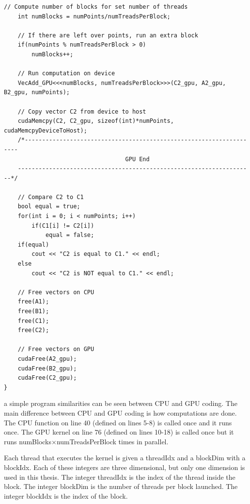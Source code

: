 \begin{lstlisting}[caption={Comparison of CPU verse GPU code.},label={code:GPUvsCPU}]
	// Compute number of blocks for set number of threads
	int numBlocks = numPoints/numTreadsPerBlock;

	// If there are left over points, run an extra block
	if(numPoints % numTreadsPerBlock > 0)
		numBlocks++;

	// Run computation on device
	VecAdd_GPU<<<numBlocks, numTreadsPerBlock>>>(C2_gpu, A2_gpu, B2_gpu, numPoints);

	// Copy vector C2 from device to host
	cudaMemcpy(C2, C2_gpu, sizeof(int)*numPoints, cudaMemcpyDeviceToHost);
	/*--------------------------------------------------------------------
                               	   GPU End
	--------------------------------------------------------------------*/

	// Compare C2 to C1
	bool equal = true;
	for(int i = 0; i < numPoints; i++)
		if(C1[i] != C2[i])
			equal = false;
	if(equal)
		cout << "C2 is equal to C1." << endl;
	else
		cout << "C2 is NOT equal to C1." << endl;

	// Free vectors on CPU
	free(A1);
	free(B1);
	free(C1);
	free(C2);

	// Free vectors on GPU
	cudaFree(A2_gpu);
	cudaFree(B2_gpu);
	cudaFree(C2_gpu);
}
\end{lstlisting}
\doublespacing


a simple program similarities can be seen between CPU and GPU coding.
The main difference between CPU and GPU coding is how computations are done.
The CPU function on line 40 (defined on lines 5-8) is called once and it runs once.
The GPU kernel on line 76 (defined on lines 10-18) is called once but it runs numBlocks$\times$numTreadsPerBlock times in parallel.

Each thread that executes the kernel is given a threadIdx and a blockDim with a blockIdx.
Each of these integers are three dimensional, but only one dimension is used in this thesis.
The integer threadIdx is the index of the thread inside the block.
The integer blockDim is the number of threads per block launched.
The integer blockIdx is the index of the block.

